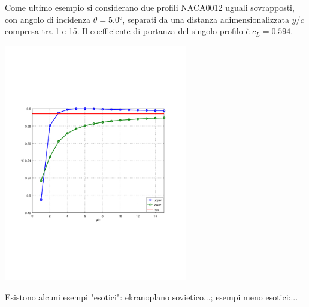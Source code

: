 Come ultimo esempio si considerano due profili NACA0012 uguali sovrapposti,
 con angolo di incidenza $\theta=5.0°$, separati da una distanza
 adimensionalizzata $y/c$ compresa tra 1 e 15. Il coefficiente di portanza
 del singolo profilo è $c_L = 0.594$.

\begin{center}
\includegraphics[width=0.60\textwidth,trim={0 5cm 0 5cm},clip]
       {./fig/vanes.pdf}
\end{center}

\noindent
Esistono alcuni esempi "esotici": ekranoplano sovietico...; esempi meno esotici:...
